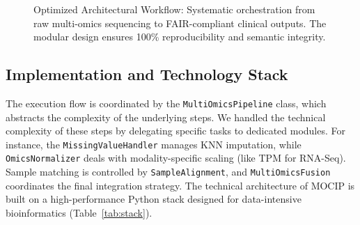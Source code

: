 \documentclass[12pt,a4paper,onecolumn]{article}
\begin{document}
\begin{figure}[H]
{
}
\caption{Optimized Architectural Workflow: Systematic orchestration from raw multi-omics sequencing to FAIR-compliant clinical outputs. The modular design ensures 100\% reproducibility and semantic integrity.}\label{fig:pipeline_dag}
\end{figure}

\subsection{Implementation and Technology Stack}
The execution flow is coordinated by the \texttt{MultiOmicsPipeline} class, which abstracts the complexity of the underlying steps. We handled the technical complexity of these steps by delegating specific tasks to dedicated modules. For instance, the \texttt{MissingValueHandler} manages KNN imputation, while \texttt{OmicsNormalizer} deals with modality-specific scaling (like TPM for RNA-Seq). Sample matching is controlled by \texttt{SampleAlignment}, and \texttt{MultiOmicsFusion} coordinates the final integration strategy. The technical architecture of MOCIP is built on a high-performance Python stack designed for data-intensive bioinformatics (Table~\ref{tab:stack}).
\end{document}
